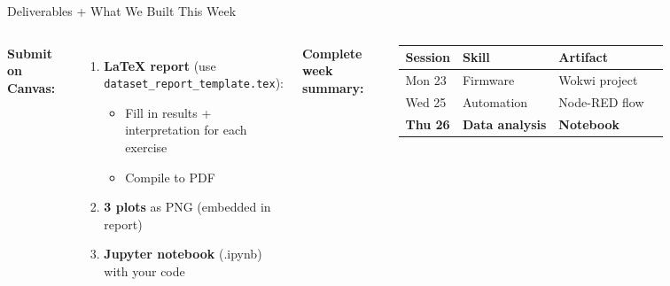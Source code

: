 \documentclass[aspectratio=169,11pt]{beamer}
\begin{document}
\begin{frame}[shrink=5]{Deliverables + What We Built This Week}
    \begin{columns}
        \textbf{Submit on Canvas:}

        \vspace{0.15cm}
        \begin{enumerate}
            \item \textbf{LaTeX report} (use \texttt{dataset\_report\_template.tex}):
            \begin{itemize}
                \item Fill in results + interpretation for each exercise
                \item Compile to PDF
            \end{itemize}
            \item \textbf{3 plots} as PNG (embedded in report)
            \item \textbf{Jupyter notebook} (.ipynb) with your code
        \end{enumerate}

        \vspace{0.15cm}

        \textbf{Complete week summary:}

        \vspace{0.1cm}
        \begin{tabular}{llll}
            \toprule
            \textbf{Session} & \textbf{Skill} & \textbf{Artifact} \\
            \midrule
            Mon 23 & Firmware & Wokwi project \\
            Wed 25 & Automation & Node-RED flow \\
            \textbf{Thu 26} & \textbf{Data analysis} & \textbf{Notebook} \\
            \bottomrule
        \end{tabular}


\end{columns}
\end{frame}
\end{document}
